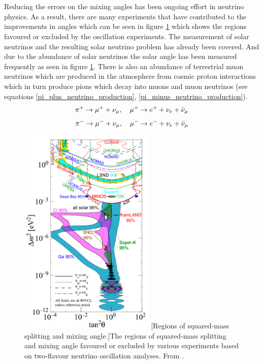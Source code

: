 \\\\Reducing the errors on the mixing angles has been ongoing effort in neutrino physics. As a result, there are many experiments that have contributed to the improvements in angles which can be seen in figure \ref{neutrino_angles_experiments_variations} 
 which shows the regions favoured or excluded by the oscillation experiments. The measurement of solar neutrinos and the resulting solar neutrino problem has already been covered. And due to the abundance of solar neutrinos the solar angle has been measured frequently as seen in figure \ref{neutrino_angles_experiments_variations}. There is also an abundance of terrestrial muon neutrinos which are produced in the atmosphere from cosmic proton interactions which in turn produce pions which decay into muons and muon neutrinos \cite{griffiths2008neutrinoOscillations} (see equations \ref{pi_plus_neutrino_production}, \ref{pi_minus_neutrino_production}).
\begin{equation}
    \pi^+ \rightarrow \mu^+ + \nu_\mu,\quad \mu^+ \rightarrow e^+ + \nu_e + \Bar{\nu}_\mu 
    \label{pi_plus_neutrino_production}
\end{equation}
\begin{equation}
    \pi^- \rightarrow \mu^- + \nu_\mu, \quad \mu^- \rightarrow e^- + \nu_e + \Bar{\nu}_\mu 
    \label{pi_minus_neutrino_production}
\end{equation}
\begin{figure}[!h]
 \centering
 \includegraphics[height=100mm]{Chapter1/Figs/Raster/neutrino_angles_experiments_variations.png} %
 [Regions of squared-mass splitting and mixing angle.]{The regions of squared-mass splitting and mixing angle favoured or excluded by various experiments based on two-flavour neutrino oscillation analyses. From \cite{Olive_2014}.} %
 \label{neutrino_angles_experiments_variations}
\end{figure}
